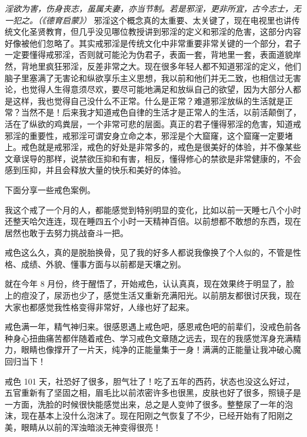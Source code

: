 \textit{淫欲为害，伤身丧志，虽属夫妻，亦当节制。若是邪淫，更非所宜，古今志士，无一犯之。（《德育启蒙》）} 邪淫这个概念真的太重要、太关键了，现在电视里也讲传统文化圣贤教育，但几乎没见哪位教授讲到邪淫的定义和邪淫的危害，这部分内容好像被他们忽略了。其实戒邪淫是传统文化中非常重要非常关键的一个部分，君子一定要懂得戒邪淫，否则就可能沦为伪君子，表面一套，背地里一套，表面道貌岸然，背地里疯狂邪淫，反差非常之大。现在很多年轻人都不知道邪淫的定义，他们脑子里塞满了无害论和纵欲享乐主义思想，我以前和他们并无二致，也相信过无害论，也觉得人生得意须尽欢，要尽可能地满足和放纵自己的欲望，因为大部分人都是这样，我也觉得自己没什么不正常。什么是正常？难道邪淫放纵的生活就是正常？当然不是！后来我才知道戒色自律的生活才是正常人的生活，以前活颠倒了，活在了纵欲的鸡粪层，一个非常可悲的层面。真正的君子懂得邪淫的危害，知道戒邪淫的重要性，戒邪淫可谓安身立命之本，邪淫是个大窟窿，这个窟窿一定要堵上。戒色就是戒邪淫，戒色的好处是非常多的，戒色是很美好的体验，并不像某些文章误导的那样，说禁欲压抑和有害，相反，懂得修心的禁欲是非常健康的，不会感到压抑，并且会释放大量的快乐和美好的体验。

下面分享一些戒色案例。

\begin{case}
    我这个戒了一个月的人，都能感觉到特别明显的变化，比如以前一天睡七八个小时还整天哈欠连连，现在睡四五个小时一天精神百倍。以前想都不敢想的东西，现在居然也敢于去努力挑战奋斗一把。
\end{case}

\begin{case}
    戒色这么久，真的是脱胎换骨，见了我的好多人都说我像换了个人似的，不管是性格、成绩、外貌、懂事方面与以前都是天壤之别。
\end{case}

\begin{case}
    就在今年 8 月份，终于醒悟了，开始戒色，认认真真，现在效果终于明显了，脸上的痘没了，尿沥也少了，感觉生活又重新充满阳光。以前朋友都很讨厌我，现在大家也都感觉我性格变得非常好，人缘也好了起来。
\end{case}

\begin{case}
    戒色满一年，精气神归来。很感恩遇上戒色吧，感恩戒色吧的前辈们，没戒色前各种身心扭曲痛苦都伴随着戒色、学习戒色文章随之远去，现在的我感觉浑身充满精力，眼睛也像撑开了一片天，纯净的正能量集于一身！满满的正能量让我冲破心魔回归当下！
\end{case}

\begin{case}
    戒色 101 天，社恐好了很多，胆气壮了！吃了五年的西药，状态也没这么好过，五官重新有了坚固之相，眉毛比以前浓密许多也很黑，皮肤也好了很多，照镜子是一方面，洗脸的时候很快能感觉出来，总之是人变帅了很多。整整尿了一年的泡沫，现在基本上没什么泡沫了。现在阳刚之气恢复了不少，已经开始有了阳刚之美，眼睛从以前的浑浊暗淡无神变得很亮！
\end{case}

